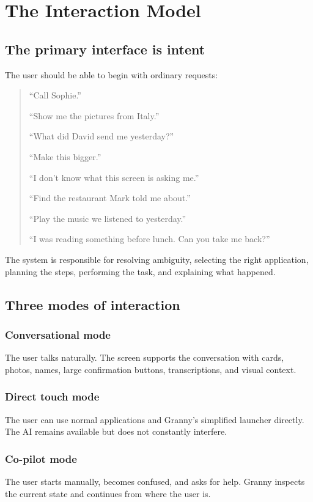 \documentclass[11pt]{article}
\begin{document}
\section{The Interaction Model}

\subsection{The primary interface is intent}
The user should be able to begin with ordinary requests:

\begin{quote}
``Call Sophie.''

``Show me the pictures from Italy.''

``What did David send me yesterday?''

``Make this bigger.''

``I don't know what this screen is asking me.''

``Find the restaurant Mark told me about.''

``Play the music we listened to yesterday.''

``I was reading something before lunch. Can you take me back?''
\end{quote}

The system is responsible for resolving ambiguity, selecting the right application, planning the steps, performing the task, and explaining what happened.

\subsection{Three modes of interaction}
\subsubsection{Conversational mode}
The user talks naturally. The screen supports the conversation with cards, photos, names, large confirmation buttons, transcriptions, and visual context.

\subsubsection{Direct touch mode}
The user can use normal applications and Granny's simplified launcher directly. The AI remains available but does not constantly interfere.

\subsubsection{Co-pilot mode}
The user starts manually, becomes confused, and asks for help. Granny inspects the current state and continues from where the user is.
\end{document}
